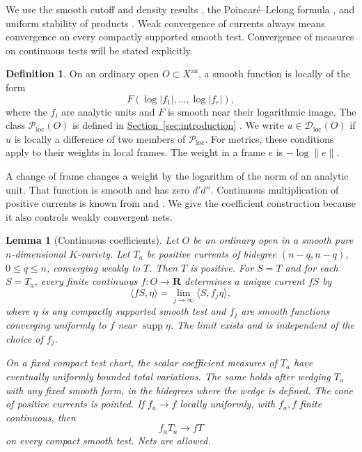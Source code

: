 \documentclass[11pt]{amsart}
\newtheorem{lemma}[theorem]{Lemma}
\theoremstyle{definition}
\newtheorem{definition}[theorem]{Definition}
\theoremstyle{remark}
\numberwithin{equation}{section}
\newcommand{\an}{\mathrm{an}}
\newcommand{\Ploc}{\mathcal P_{\mathrm{loc}}}
\newcommand{\Dloc}{\mathcal D_{\mathrm{loc}}}
\newcommand{\R}{\mathbf R}
\newcommand{\namedref}[2]{%
 \begingroup
 \ifstrequal{#1}{Section}{\hypersetup{linkcolor=sectionteal}}{%
  \ifstrequal{#1}{Appendix}{\hypersetup{linkcolor=sectionteal}}{}}%
 \hyperref[#2]{#1~\ref*{#2}}%
 \endgroup}
\DeclareMathOperator{\supp}{supp}
\begin{document}
We use the smooth cutoff and density results
\cite[Corollary 3.3.4 and Propositions 3.3.5--3.3.6]{CLD12},
the Poincar\'e--Lelong formula \cite[Theorem 4.6.5]{CLD12}, and
uniform stability of products
\cite[Corollary 5.6.5]{CLD12}. Weak convergence of currents always
means convergence on every compactly supported smooth test.
Convergence of measures on continuous tests will be stated explicitly.

\begin{definition}\label{def:approachable}
On an ordinary open \(O\subset X^\an\), a smooth function is locally
of the form
\[
 F(\log|f_1|,\ldots,\log|f_r|),
\]
where the \(f_i\) are analytic units and \(F\) is smooth near their
logarithmic image. The class \(\Ploc(O)\) is defined in
\namedref{Section}{sec:introduction}. We write \(u\in\Dloc(O)\) if \(u\)
is locally a difference of two members of \(\Ploc\).
For metrics, these conditions apply to their weights in local frames.
The weight in a frame \(e\) is \(-\log\|e\|\).
\end{definition}

A change of frame changes a weight by the logarithm of the norm of an
analytic unit. That function is smooth and has zero \(d'd''\).
Continuous multiplication of positive currents is known from
\cite[Corollary 5.4.7]{CLD12} and \cite[Lemma 8.5.1]{CLD25}.
We give the coefficient construction because it also controls
weakly convergent nets.

\begin{lemma}[Continuous coefficients]\label{lem:continuous-coefficients}
Let \(O\) be an ordinary open in a smooth pure \(n\)-dimensional
\(K\)-variety. Let \(T_a\) be positive currents of bidegree
\((n-q,n-q)\), \(0\leq q\leq n\), converging weakly to \(T\).
Then \(T\) is positive. For \(S=T\) and for each \(S=T_a\), every finite
continuous \(f:O\to\R\) determines a unique current \(fS\) by
\[
 \langle fS,\eta\rangle
   =\lim_{j\to\infty}\langle S,f_j\eta\rangle,
\]
where \(\eta\) is any compactly supported smooth test and \(f_j\)
are smooth functions converging uniformly to \(f\) near
\(\supp\eta\). The limit exists and is independent of the choice
of \(f_j\).

On a fixed compact test chart, the scalar coefficient measures of
\(T_a\) have eventually uniformly bounded total variations. The same
holds after wedging \(T_a\) with any fixed smooth form, in the
bidegrees where the wedge is defined. The cone of positive currents
is pointed. If \(f_a\to f\) locally uniformly, with \(f_a,f\)
finite continuous, then
\begin{equation}\label{eq:moving-coefficients}
 f_aT_a\longrightarrow fT
\end{equation}
on every compact smooth test. Nets are allowed.
\end{lemma}
\end{document}
